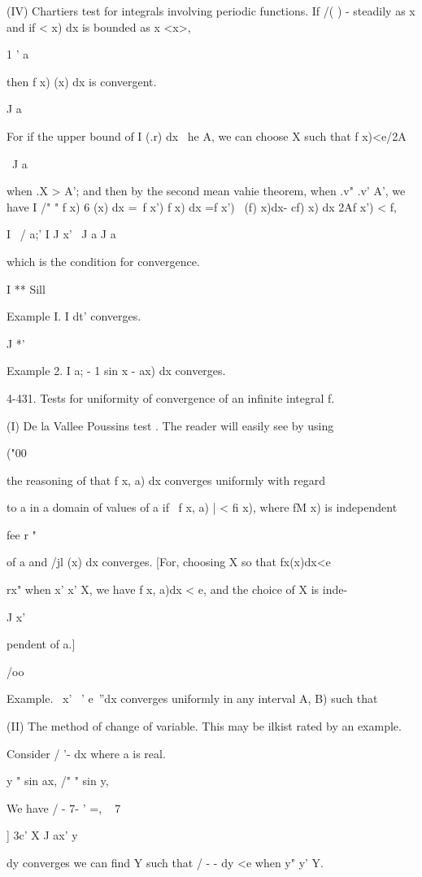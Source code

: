 (IV) Chartiers test for integrals involving periodic functions. If /(
) - steadily as x and if < x) dx is bounded as x <x>,

1 ' a

then f x) (x) dx is convergent.

J a

For if the upper bound of I (.r) dx \ he A, we can choose X such that
f x)<e/2A

\ J a

when .X > A'; and then by the second mean vahie theorem, when .v" .v'
A', we have I /" " f x) 6 (x) dx =\ f x') f x) dx =f x') \ (f) x)dx-
cf) x) dx 2Af x') < f,

I \ / a;'  I J x' \ J a J a

which is the condition for convergence.

I ** Sill

Example I. I dt' converges.

J *'

Example 2. I a; - 1 sin x - ax) dx converges.

4-431. Tests for uniformity of convergence of an infinite integral f.

(I) De la Vallee Poussins test . The reader will easily see by using

("00

the reasoning of that f x, a) dx converges uniformly with
regard

to a in a domain of values of a if \ f x, a) | < fi x), where fM x) is
independent

fee r "

of a and /jl (x) dx converges. [For, choosing X so that fx(x)dx<e

rx" when x' x' X, we have f x, a)dx < e, and the choice of X is inde-

J x'

pendent of a.]

/oo

Example. \ x' ~' e~''dx converges uniformly in any interval A, B) such
that

(II) The method of change of variable. This may be ilkist rated by an
example.

Consider / '- dx where a is real.

y " sin ax, /" " sin y,

We have / - 7- ' =, ~ 7~ 

] 3c' X J ax' y

   dy converges we can find Y such that / - - dy <e when y" y' Y.

